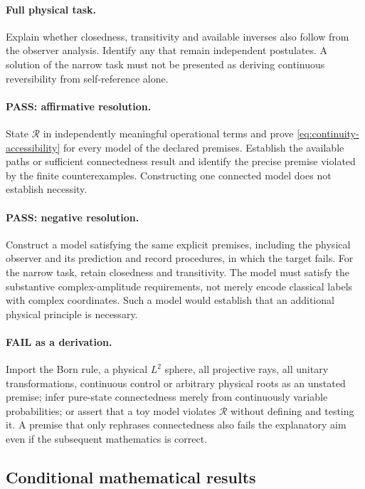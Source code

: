 \paragraph{Full physical task.}
Explain whether closedness, transitivity and available inverses also
follow from the observer analysis. Identify any that remain independent
postulates. A solution of the narrow task must not be presented as deriving
continuous reversibility from self-reference alone.

\paragraph{PASS: affirmative resolution.}
State $\mathcal R$ in independently meaningful operational terms and prove
\eqref{eq:continuity-accessibility} for every model of the declared premises.
Establish the available paths or sufficient connectedness result and identify
the precise premise violated by the finite counterexamples. Constructing
one connected model does not establish necessity.

\paragraph{PASS: negative resolution.}
Construct a model satisfying the same explicit premises, including the
physical observer and its prediction and record procedures, in which the
target fails. For the narrow task, retain closedness and transitivity. The
model must satisfy the substantive complex-amplitude requirements, not
merely encode classical labels with complex coordinates. Such a model would
establish that an additional physical principle is necessary.

\paragraph{FAIL as a derivation.}
Import the Born rule, a physical $L^2$ sphere, all projective rays, all
unitary transformations, continuous control or arbitrary physical roots as
an unstated premise; infer pure-state connectedness merely from continuously
variable probabilities; or assert that a toy model violates $\mathcal R$
without defining and testing it. A premise that only rephrases connectedness
also fails the explanatory aim even if the subsequent mathematics is correct.

\subsection{Conditional mathematical results}
\label{app:continuity-conditional-results}

